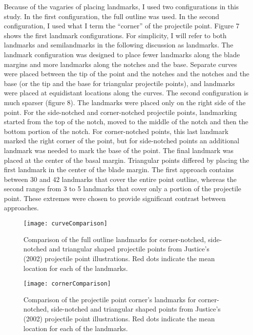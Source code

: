 \documentclass[PCJ,Unicode,screen,mode=plain]{cedram}
\begin{document}
Because of the vagaries of placing landmarks, I used two configurations in this study. In the first configuration, the full outline was used. In the second configuration, I used what I term the ``corner'' of the projectile point. Figure 7 shows the first landmark configurations. For simplicity, I will refer to both landmarks and semilandmarks in the following discussion as landmarks. The landmark configuration was designed to place fewer landmarks along the blade margins and more landmarks along the notches and the base. Separate curves were placed between the tip of the point and the notches and the notches and the base (or the tip and the base for triangular projectile points), and landmarks were placed at equidistant locations along the curves. The second configuration is much sparser (figure 8). The landmarks were placed only on the right side of the point. For the side-notched and corner-notched projectile points, landmarking started from the top of the notch, moved to the middle of the notch and then the bottom portion of the notch. For corner-notched points, this last landmark marked the right corner of the point, but for side-notched points an additional landmark was needed to mark the base of the point. The final landmark was placed at the center of the basal margin. Triangular points differed by placing the first landmark in the center of the blade margin. The first approach contains between 30 and 42 landmarks that cover the entire point outline, whereas the second ranges from 3 to 5 landmarks that cover only a portion of the projectile point. These extremes were chosen to provide significant contrast between approaches.

\begin{figure}
\texttt{[image: curveComparison]} \caption{Comparison of the full outline landmarks for corner-notched, side-notched and triangular shaped projectile points from Justice's (2002) projectile point illustrations. Red dots indicate the mean location for each of the landmarks.}\label{fig:curvesStack}
\end{figure}

\begin{figure}
\texttt{[image: cornerComparison]} \caption{Comparison of the projectile point corner's landmarks for corner-notched, side-notched and triangular shaped points from Justice's (2002) projectile point illustrations. Red dots indicate the mean location for each of the landmarks.}\label{fig:cornerComparison}
\end{figure}
\end{document}
